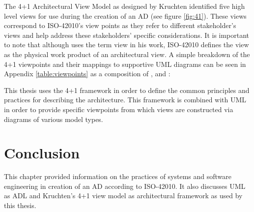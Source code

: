 
The 4+1 Architectural View Model as designed by Kruchten \cite{Kruchten} identified five high level views for use during the creation of an AD (see figure \ref{fig:41}). These views correspond to ISO-42010's view points as they refer to different stakeholder's views and help address these stakeholders' specific considerations. It is important to note that although \cite{Kruchten} uses the term view in his work, ISO-42010 defines the view as the physical work product of an architectural view. A simple breakdown of the 4+1 viewpoints and their mappings to supportive UML diagrams can be seen in Appendix \ref{table:viewpoints} as a composition of \cite{Wiki4plus1}, \cite{Muchandi2007} and \cite{Kruchten}:


This thesis uses the 4+1 framework in order to define the common principles and practices for describing the architecture. This framework is combined with UML in order to provide specific viewpoints from which views are constructed via diagrams of various model types.

\section{Conclusion}

This chapter provided information on the practices of systems and software engineering in creation of an AD according to ISO-42010. It also discusses UML as ADL and Kruchten's 4+1 view model as architectural framework as used by this thesis.


